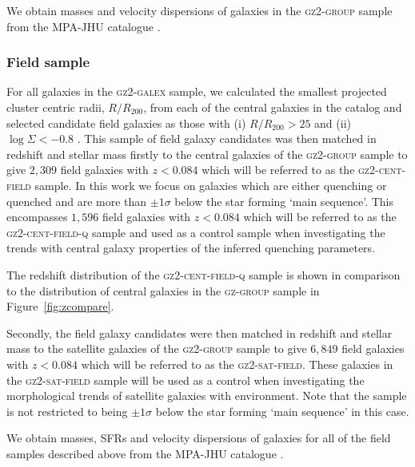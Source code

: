 \documentclass[useAMS,usenatbib]{mn2e}
\begin{document}
We obtain masses and velocity dispersions of galaxies in the \textsc{gz2-group} sample from the MPA-JHU catalogue \citep{kauffmann03, brinchmann04}.

\subsubsection{Field sample}\label{sec:field}

For all galaxies in the \textsc{gz2-galex} sample, we calculated the smallest projected cluster centric radii, $R/R_{200}$, from each of the central galaxies in the  \citet{berlind06} catalog and selected candidate field galaxies as those with (i) $R/R_{200} > 25$ and (ii) $\log\Sigma < -0.8$ \citep[a measure of environmental density from][]{baldry06}. This sample of field galaxy candidates was then matched in redshift and stellar mass firstly to the central galaxies of the \textsc{gz2-group} sample to give $2,309$ field galaxies with $z < 0.084$ which will be referred to as the \textsc{gz2-cent-field} sample. In this work we focus on galaxies which are either quenching or quenched and are more than $\pm1\sigma$ below the star forming `main sequence'. This encompasses $1,596$ field galaxies with $z < 0.084$ which will be referred to as the \textsc{gz2-cent-field-q} sample and used as a control sample when investigating the trends with central galaxy properties of the inferred quenching parameters. 

The redshift distribution of the \textsc{gz2-cent-field-q} sample is shown in comparison to the distribution of central galaxies in the \textsc{gz-group} sample in Figure~\ref{fig:zcompare}. %

Secondly, the field galaxy candidates were then matched in redshift and stellar mass to the satellite galaxies of the \textsc{gz2-group} sample to give $6,849$ field galaxies with $z < 0.084$ which will be referred to as the \textsc{gz2-sat-field}. These galaxies in the \textsc{gz2-sat-field} sample will be used as a control when investigating the morphological trends of satellite galaxies with environment. Note that the sample is not restricted to being $\pm1\sigma$ below the star forming `main sequence' in this case. %

We obtain masses, SFRs and velocity dispersions of galaxies for all of the field samples described above from the MPA-JHU catalogue \citep{kauffmann03, brinchmann04}.
\end{document}
